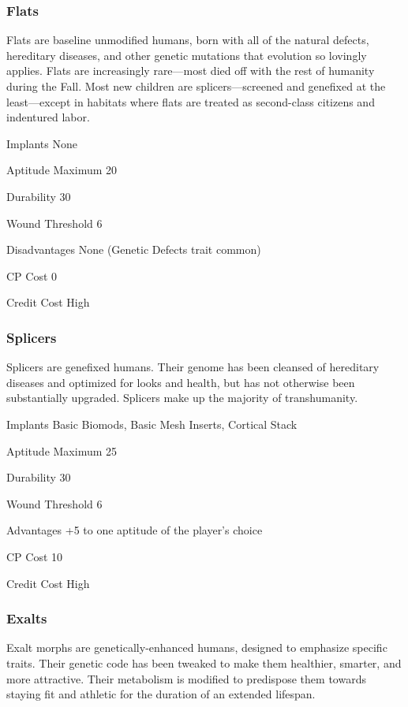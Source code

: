 \subsubsection{Flats}
Flats are baseline unmodified humans, born with all of the natural defects,
hereditary diseases, and other genetic mutations that evolution so lovingly
applies.  Flats are increasingly rare—most died off with the rest of humanity
during the Fall. Most new children are splicers—screened and genefixed at the
least—except in habitats where flats are treated as second-class citizens and
indentured labor.

\begin{description*}
\item[Implants] None
\item[Aptitude Maximum] 20
\item[Durability] 30
\item[Wound Threshold] 6
\item[Disadvantages] None (Genetic Defects trait common)
\item[CP Cost] 0
\item[Credit Cost] High
\end{description*}

\subsubsection{Splicers}
Splicers are genefixed humans. Their genome has been cleansed of hereditary
diseases and optimized for looks and health, but has not otherwise been
substantially upgraded. Splicers make up the majority of transhumanity.

\begin{description*}
\item[Implants] Basic Biomods, Basic Mesh Inserts, Cortical Stack
\item[Aptitude Maximum] 25
\item[Durability] 30
\item[Wound Threshold] 6
\item[Advantages] +5 to one aptitude of the player’s choice
\item[CP Cost] 10
\item[Credit Cost] High
\end{description*}

\subsubsection{Exalts}
Exalt morphs are genetically-enhanced humans, designed to emphasize specific
traits. Their genetic code has been tweaked to make them healthier, smarter,
and more attractive. Their metabolism is modified to predispose them towards
staying fit and athletic for the duration of an extended lifespan.

